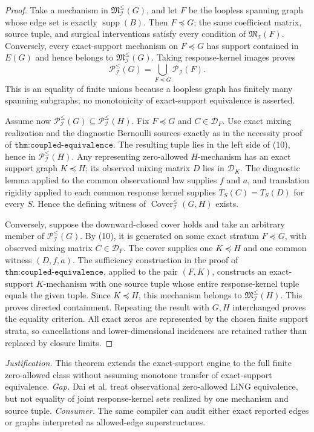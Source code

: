 \documentclass{article}
\begin{document}
\begin{proof}
Take a mechanism in \(\mathfrak M^{\le}_{\mathcal I}(G)\), and let \(F\) be the loopless spanning graph whose edge set is exactly \(\operatorname{supp}(B)\). Then \(F\preceq G\); the same coefficient matrix, source tuple, and surgical interventions satisfy every condition of \(\mathfrak M_{\mathcal I}(F)\). Conversely, every exact-support mechanism on \(F\preceq G\) has support contained in \(E(G)\) and hence belongs to \(\mathfrak M^{\le}_{\mathcal I}(G)\). Taking response-kernel images proves
\[
\mathcal P^{\le}_{\mathcal I}(G)=\bigcup_{F\preceq G}\mathcal P_{\mathcal I}(F). \tag{10}
\]
This is an equality of finite unions because a loopless graph has finitely many spanning subgraphs; no monotonicity of exact-support equivalence is asserted.

Assume now \(\mathcal P^{\le}_{\mathcal I}(G)\subseteq\mathcal P^{\le}_{\mathcal I}(H)\). Fix \(F\preceq G\) and \(C\in\mathcal D_F\). Use exact mixing realization and the diagnostic Bernoulli sources exactly as in the necessity proof of \(\texttt{thm:coupled-equivalence}\). The resulting tuple lies in the left side of (10), hence in \(\mathcal P^{\le}_{\mathcal I}(H)\). Any representing zero-allowed \(H\)-mechanism has an exact support graph \(K\preceq H\); its observed mixing matrix \(D\) lies in \(\mathcal D_K\). The diagnostic lemma applied to the common observational law supplies \(f\) and \(a\), and translation rigidity applied to each common response kernel supplies \(T_S(C)=T_S(D)\) for every \(S\). Hence the defining witness of \(\operatorname{Cover}^{\le}_{\mathcal I}(G,H)\) exists.

Conversely, suppose the downward-closed cover holds and take an arbitrary member of \(\mathcal P^{\le}_{\mathcal I}(G)\). By (10), it is generated on some exact stratum \(F\preceq G\), with observed mixing matrix \(C\in\mathcal D_F\). The cover supplies one \(K\preceq H\) and one common witness \((D,f,a)\). The sufficiency construction in the proof of \(\texttt{thm:coupled-equivalence}\), applied to the pair \((F,K)\), constructs an exact-support \(K\)-mechanism with one source tuple whose entire response-kernel tuple equals the given tuple. Since \(K\preceq H\), this mechanism belongs to \(\mathfrak M^{\le}_{\mathcal I}(H)\). This proves directed containment. Repeating the result with \(G,H\) interchanged proves the equality criterion. All exact zeros are represented by the chosen finite support strata, so cancellations and lower-dimensional incidences are retained rather than replaced by closure limits.
\end{proof}
\par\smallskip\noindent \textit{Justification.} This theorem extends the exact-support engine to the full finite zero-allowed class without assuming monotone transfer of exact-support equivalence. \textit{Gap.} Dai et al. treat observational zero-allowed LiNG equivalence, but not equality of joint response-kernel sets realized by one mechanism and source tuple. \textit{Consumer.} The same compiler can audit either exact reported edges or graphs interpreted as allowed-edge superstructures.
\end{document}
